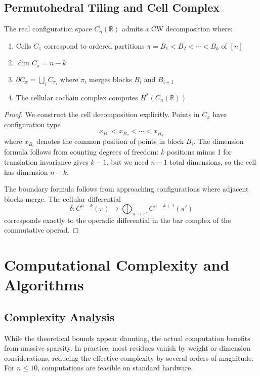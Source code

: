 \subsection{Permutohedral Tiling and Cell Complex}
 
\begin{theorem}
The real configuration space $C_n(\mathbb{R})$ admits a CW decomposition where:
\begin{enumerate}
\item Cells $C_\pi$ correspond to ordered partitions $\pi = B_1 < B_2 < \cdots < B_k$ of $[n]$
\item $\dim C_\pi = n - k$
\item $\partial C_\pi = \bigcup_{i} C_{\pi_i}$ where $\pi_i$ merges blocks $B_i$ and $B_{i+1}$
\item The cellular cochain complex computes $H^*(C_n(\mathbb{R}))$
\end{enumerate}
\end{theorem} 
\begin{proof}
We construct the cell decomposition explicitly. Points in $C_\pi$ have configuration type
\[
x_{B_1} < x_{B_2} < \cdots < x_{B_k}
\]
where $x_{B_i}$ denotes the common position of points in block $B_i$. The dimension formula follows from counting degrees of freedom: $k$ positions minus 1 for translation invariance gives $k-1$, but we need $n-1$ total dimensions, so the cell has dimension $n-k$.
 
The boundary formula follows from approaching configurations where adjacent blocks merge. The cellular differential
\[
\delta: C^{n-k}(\pi) \to \bigoplus_{\pi \to \pi'} C^{n-k+1}(\pi')
\]
corresponds exactly to the operadic differential in the bar complex of the commutative operad.
\end{proof}
 
\section{Computational Complexity and Algorithms}
 
\subsection{Complexity Analysis}

\begin{remark}
While the theoretical bounds appear daunting,
the actual computation benefits from massive sparsity. In practice, most residues vanish
by weight or dimension considerations, reducing the effective complexity by several orders
of magnitude. For $n \leq 10$, computations are feasible on standard hardware.
\end{remark}

